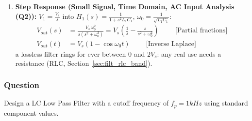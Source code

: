 \begin{enumerate}
    \paragraph{At Output:} (looking in from \(V_{out}\) with both sources
    shorted, \(L_1\) and \(C_1\) are in parallel)
      \begin{align*}
        Z_{out} &= \frac{1}{sC_1} \parallel sL_1 \\
        Z_{out} &= \frac{\left( \frac{1}{sC_1} \cdot sL_1 \right)}{\left( \frac{1}{sC_1} + sL_1 \right)} \\
        Z_{out} &= \frac{\frac{L_1}{C_1}}{\frac{1 + s^2 L_1 C_1}{sC_1}} \hspace{1cm} \text{(Common denominator \(sC_1\))} \\
        Z_{out} &= \frac{L_1}{C_1} \cdot \frac{sC_1}{s^2 L_1 C_1 + 1} \\
        Z_{out} &= \frac{sL_1}{s^2 L_1 C_1 + 1} \\
        Z_{out} &= \frac{j \omega L_1}{(j \omega)^2 L_1 C_1 + 1} \hspace{1cm} \text{(Substituting \(s = j \omega\))} \\
        Z_{out} &= \frac{j \omega L_1}{- \omega^2 L_1 C_1 + 1} \\
        Z_{out} &= j \frac{\omega L_1}{1 - \omega^2 L_1 C_1}
      \end{align*}
    Both impedances are purely reactive: \(Z_{in} = 0\) and
    \(|Z_{out}| \to \infty\) at \(\omega = \frac{1}{\sqrt{L_1 C_1}}\).
  \item \textbf{Step Response (Small Signal, Time Domain, AC Input Analysis (Q2)):}
    \(V_1 = \frac{V_s}{s}\) into \(H_1(s) = \frac{1}{1 + s^2L_1C_1}\), \(\omega_0 = \frac{1}{\sqrt{L_1C_1}}\):
    \begin{align*}
      V_{out}(s) &= \frac{V_s\,\omega_0^2}{s(s^2 + \omega_0^2)} = V_s\left(\frac{1}{s} - \frac{s}{s^2 + \omega_0^2}\right) \hspace{1cm} \text{[Partial fractions]} \\
      V_{out}(t) &= V_s\left(1 - \cos\omega_0 t\right) \hspace{1cm} \text{[Inverse Laplace]}
    \end{align*}
    a lossless filter rings for ever between 0 and \(2V_s\): any real use needs a resistance (RLC, Section~\ref{sec:filt_rlc_band}).
\end{enumerate}

\subsubsection{Question}
Design a LC Low Pass Filter with a cutoff frequency of
\(f_p = 1 kHz\) using standard component values.
